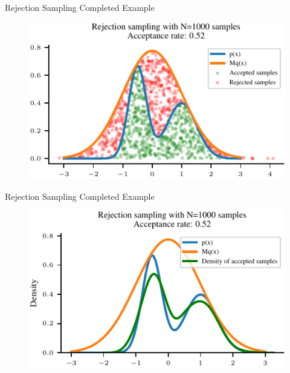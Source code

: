 \documentclass[handout]{beamer}
\begin{document}
    \begin{frame}{Rejection Sampling Completed Example}
        \begin{figure}
            \centering
            \includegraphics{notebooks/figures/sampling/rejection-sampling-N1000-False.pdf}
        \end{figure}
    \end{frame}

    \begin{frame}{Rejection Sampling Completed Example}
        \begin{figure}
            \centering
            \includegraphics{notebooks/figures/sampling/rejection-sampling-N1000-True.pdf}
        \end{figure}
    \end{frame}
\end{document}
